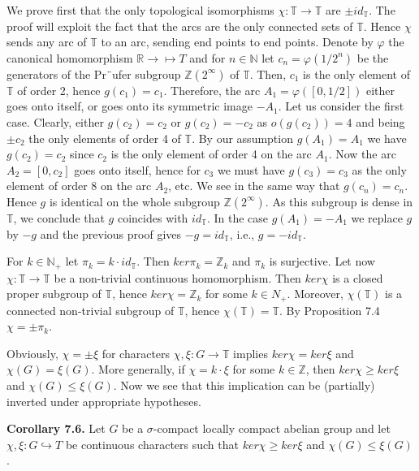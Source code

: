 \documentclass[12pt]{article}
\begin{document}
\begin{itemize}
\begin{itemize}
 We prove first that the only topological isomorphisms $\chi : \mathbb{T} \to \mathbb{T}$ are $\pm id_{\mathbb{T}}$. The proof will exploit the
fact that the arcs are the only connected sets of $\mathbb{T}$. Hence $\chi$ sends any arc of $\mathbb{T}$ to an arc, sending end points to
end points. Denote by $\varphi$ the canonical homomorphism $\mathbb{R} \to \mapsto{T}$ and for $n \in \mathbb{N}$ let $c_n = \varphi(1/2^n)$ be the generators
of the Pr¨ufer subgroup $\mathbb{Z}(2^{\infty})$ of $\mathbb{T}$. Then, $c_1$ is the only element of $\mathbb{T}$ of order 2, hence $g(c_1) = c_1$. Therefore,
the arc $A_1 = \varphi([0, 1/2])$ either goes onto itself, or goes onto its symmetric image $-A_1$. Let us consider the first
case. Clearly, either $g(c_2) = c_2$ or $g(c_2) = -c_2$ as $o(g(c_2)) = 4$ and being $\pm c_2$ the only elements of order 4 of $\mathbb{T}$.
By our assumption $g(A_1) = A_1$ we have $g(c_2) = c_2$ since $c_2$ is the only element of order 4 on the arc $A_1$. Now
the arc $A_2 = [0, c_2]$ goes onto itself, hence for $c_3$ we must have $g(c_3) = c_3$ as the only element of order 8 on the
arc $A_2$, etc. We see in the same way that $g(c_n) = c_n$. Hence $g$ is identical on the whole subgroup $\mathbb{Z}(2^{\infty})$. As
this subgroup is dense in $\mathbb{T}$, we conclude that $g$ coincides with $id_{\mathbb{T}}$. In the case $g(A_1) = -A_1$ we replace $g$ by
$-g$ and the previous proof gives $-g = id_{\mathbb{T}}$, i.e., $g = -id_{\mathbb{T}}$.


    For $k \in \mathbb{N}_+$ let $\pi_k = k · id_{\mathbb{T}}$. Then $ker \pi_k = \mathbb{Z}_k$ and $\pi_k$ is surjective. Let now $χ : \mathbb{T} \to \mathbb{T}$ be a non-trivial
continuous homomorphism. Then $ker \chi$ is a closed proper subgroup of $\mathbb{T}$, hence $ker \chi = \mathbb{Z}_k$ for some $k \in N_+$.
Moreover, $\chi(\mathbb{T})$ is a connected non-trivial subgroup of $\mathbb{T}$, hence $\chi(\mathbb{T}) = \mathbb{T}$. By Proposition 7.4 $\chi = \pm \pi_k$.


    Obviously, $\chi = \pm \xi$ for characters $\chi, \xi : G \to \mathbb{T}$ implies $ker \chi = ker \xi$ and $\chi (G) = \xi (G)$. More generally,
if $\chi = k · \xi$ for some $k \in \mathbb{Z}$, then $ker \chi \geq ker \xi$ and $\chi (G) \leq \xi (G)$. Now we see that this implication can be
(partially) inverted under appropriate hypotheses.


\textbf{Corollary 7.6.} Let $G$ be a $\sigma$-compact locally compact abelian group and let $\chi, \xi : G \hookrightarrow T$ be continuous
characters such that $ker \chi \geq ker \xi$ and $\chi (G) \leq \xi (G)$.



\end{itemize}
\end{itemize}
\end{document}
